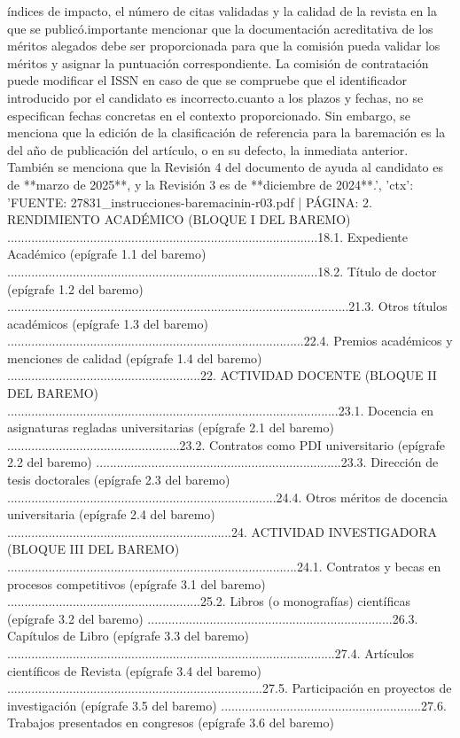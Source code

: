 \documentclass{article}
\begin{document}
\begin{itemize}
índices de impacto, el número de citas validadas y la calidad de la revista en la que se publicó.\n\nEs importante mencionar que la documentación acreditativa de los méritos alegados debe ser proporcionada para que la comisión pueda validar los méritos y asignar la puntuación correspondiente. La comisión de contratación puede modificar el ISSN en caso de que se compruebe que el identificador introducido por el candidato es incorrecto.\n\nEn cuanto a los plazos y fechas, no se especifican fechas concretas en el contexto proporcionado. Sin embargo, se menciona que la edición de la clasificación de referencia para la baremación es la del año de publicación del artículo, o en su defecto, la inmediata anterior. También se menciona que la Revisión 4 del documento de ayuda al candidato es de **marzo de 2025**, y la Revisión 3 es de **diciembre de 2024**.', 'ctx': 'FUENTE: 27831_instrucciones-baremacinin-r03.pdf | PÁGINA: 2. RENDIMIENTO ACADÉMICO (BLOQUE I DEL BAREMO) ..........................................................................................18.1. Expediente Académico (epígrafe 1.1 del baremo) ..........................................................................................18.2. Título de doctor (epígrafe 1.2 del baremo) ...................................................................................................21.3. Otros títulos académicos (epígrafe 1.3 del baremo) ......................................................................................22.4. Premios académicos y menciones de calidad (epígrafe 1.4 del baremo) ........................................................22. ACTIVIDAD DOCENTE (BLOQUE II DEL BAREMO) ................................................................................................23.1. Docencia en asignaturas regladas universitarias (epígrafe 2.1 del baremo) ..................................................23.2. Contratos como PDI universitario (epígrafe 2.2 del baremo) .......................................................................23.3. Dirección de tesis doctorales (epígrafe 2.3 del baremo) ..............................................................................24.4. Otros méritos de docencia universitaria (epígrafe 2.4 del baremo) .................................................................24. ACTIVIDAD INVESTIGADORA (BLOQUE III DEL BAREMO) ....................................................................................24.1. Contratos y becas en procesos competitivos (epígrafe 3.1 del baremo) ........................................................25.2. Libros (o monografías) científicas (epígrafe 3.2 del baremo) .......................................................................26.3. Capítulos de Libro (epígrafe 3.3 del baremo) ...............................................................................................27.4. Artículos científicos de Revista (epígrafe 3.4 del baremo) ..........................................................................27.5. Participación en proyectos de investigación (epígrafe 3.5 del baremo) ..........................................................27.6. Trabajos presentados en congresos (epígrafe 3.6 del baremo) 
\end{itemize}
\end{document}

